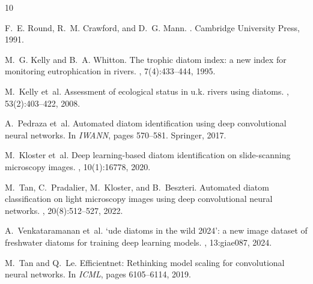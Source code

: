 \documentclass[10pt,twocolumn,a4paper]{article}
\begin{document}

\begin{thebibliography}{10}

F.~E. Round, R.~M. Crawford, and D.~G. Mann.
.
\newblock Cambridge University Press, 1991.

M.~G. Kelly and B.~A. Whitton.
\newblock The trophic diatom index: a new index for monitoring eutrophication in rivers.
, 7(4):433--444, 1995.

M.~Kelly et~al.
\newblock Assessment of ecological status in u.k. rivers using diatoms.
, 53(2):403--422, 2008.

A.~Pedraza et~al.
\newblock Automated diatom identification using deep convolutional neural networks.
\newblock In {\em IWANN}, pages 570--581. Springer, 2017.

M.~Kloster et~al.
\newblock Deep learning-based diatom identification on slide-scanning microscopy images.
, 10(1):16778, 2020.

M.~Tan, C.~Pradalier, M.~Kloster, and B.~Beszteri.
\newblock Automated diatom classification on light microscopy images using deep convolutional neural networks.
, 20(8):512--527, 2022.

A.~Venkataramanan et~al.
\newblock `ude diatoms in the wild 2024': a new image dataset of freshwater diatoms for training deep learning models.
, 13:giae087, 2024.

M.~Tan and Q.~Le.
\newblock Efficientnet: Rethinking model scaling for convolutional neural networks.
\newblock In {\em ICML}, pages 6105--6114, 2019.

\end{thebibliography}
\end{document}
